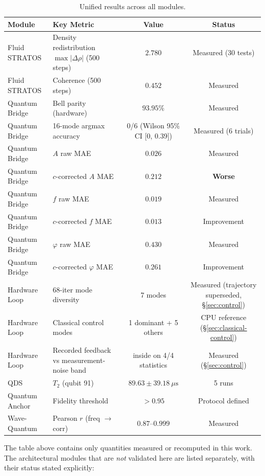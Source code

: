 \documentclass[sigconf,anonymous=false]{acmart}
\begin{document}
\begin{table}[h]
\centering
\caption{Unified results across all modules.}
\label{tab:unified}
\begin{tabular}{llcc}
\toprule
Module & Key Metric & Value & Status \\
\midrule
Fluid STRATOS & Density redistribution $\max|\Delta\rho|$ (500 steps) & $2.780$ & Measured (30 tests) \\
Fluid STRATOS & Coherence (500 steps) & $0.452$ & Measured \\
Quantum Bridge & Bell parity (hardware) & $93.95\%$ & Measured \\
Quantum Bridge & 16-mode argmax accuracy & 0/6 (Wilson 95\% CI [0, 0.39]) & Measured (6 trials) \\
Quantum Bridge & $A$ raw MAE & $0.026$ & Measured \\
Quantum Bridge & $c$-corrected $A$ MAE & $0.212$ & \textbf{Worse} \\
Quantum Bridge & $f$ raw MAE & $0.019$ & Measured \\
Quantum Bridge & $c$-corrected $f$ MAE & $0.013$ & Improvement \\
Quantum Bridge & $\varphi$ raw MAE & $0.430$ & Measured \\
Quantum Bridge & $c$-corrected $\varphi$ MAE & $0.261$ & Improvement \\
Hardware Loop & 68-iter mode diversity & 7 modes & Measured (trajectory superseded, \S\ref{sec:control}) \\
Hardware Loop & Classical control modes & 1 dominant + 5 others & CPU reference (\S\ref{sec:classical-control}) \\
Hardware Loop & Recorded feedback vs measurement-noise band & inside on 4/4 statistics & Measured (\S\ref{sec:control}) \\
QDS & $T_2$ (qubit 91) & $89.63 \pm 39.18\ \mu\text{s}$ & 5 runs \\
Quantum Anchor & Fidelity threshold & $> 0.95$ & Protocol defined \\
Wave-Quantum & Pearson $r$ (freq $\to$ corr) & $0.87$--$0.999$ & Measured \\
\bottomrule
\end{tabular}
\end{table}

The table above contains only quantities measured or recomputed in this work. The architectural
modules that are \emph{not} validated here are listed separately, with their status stated
explicitly:
\end{document}
